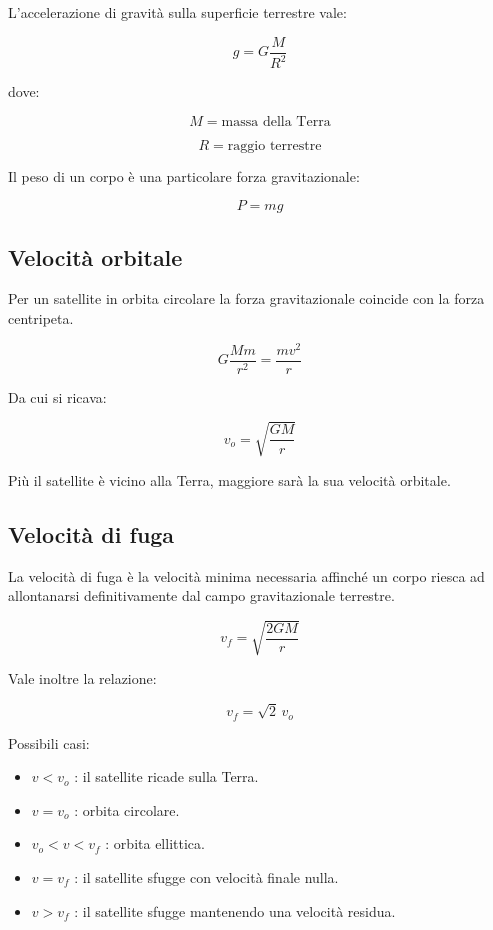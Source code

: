 \noindent L'accelerazione di gravità sulla superficie terrestre vale:

\[
g=G\frac{M}{R^2}
\]

\noindent dove:

\[
M=\text{massa della Terra}
\]

\[
R=\text{raggio terrestre}
\]

\vspace{0.3cm}

\noindent Il peso di un corpo è una particolare forza gravitazionale:

\[
P=mg
\]

\vspace{0.5cm}

\subsection{Velocità orbitale}

\noindent Per un satellite in orbita circolare la forza gravitazionale coincide con la forza centripeta.

\[
G\frac{Mm}{r^2}=\frac{mv^2}{r}
\]

\noindent Da cui si ricava:

\[
v_o=\sqrt{\frac{GM}{r}}
\]

\noindent Più il satellite è vicino alla Terra, maggiore sarà la sua velocità orbitale.

\vspace{0.5cm}

\subsection{Velocità di fuga}

\noindent La velocità di fuga è la velocità minima necessaria affinché un corpo riesca ad allontanarsi definitivamente dal campo gravitazionale terrestre.

\[
v_f=\sqrt{\frac{2GM}{r}}
\]

\noindent Vale inoltre la relazione:

\[
v_f=\sqrt{2}\,v_o
\]

\vspace{0.3cm}

\noindent Possibili casi:

\begin{itemize}
\item $v<v_o$ : il satellite ricade sulla Terra.
\item $v=v_o$ : orbita circolare.
\item $v_o<v<v_f$ : orbita ellittica.
\item $v=v_f$ : il satellite sfugge con velocità finale nulla.
\item $v>v_f$ : il satellite sfugge mantenendo una velocità residua.
\end{itemize}

